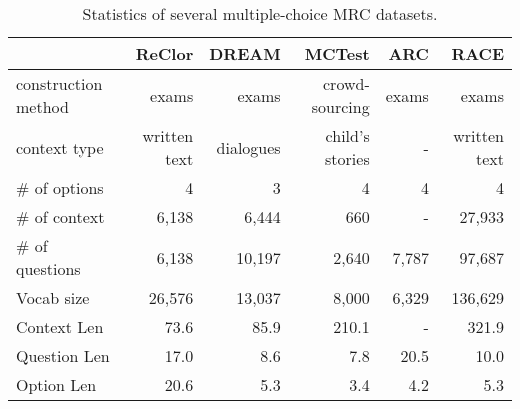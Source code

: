 \documentclass{article} \usepackage{iclr2020_conference,times}
\begin{document}
\begin{table}
\centering
\small
\begin{tabular}{lrrrrr}
& \textbf{ReClor}& \textbf{DREAM}& \textbf{MCTest}&\textbf{ARC} & \textbf{RACE}  \\ 
\hline
construction method         & exams    & exams     & crowd-sourcing &exams     & exams        \\
context type                & written text & dialogues & child's stories &-& written text \\ 
\# of options               & 4         & 3         & 4        &4        & 4            \\ 
\# of context               & 6,138     & 6,444     & 660      &-        & 27,933       \\ 
\# of questions             & 6,138     & 10,197    & 2,640     &7,787   & 97,687       \\
Vocab size                  & 26,576    & 13,037    & 8,000     & 6,329  & 136,629\\
Context Len                 & 73.6      & 85.9      & 210.1     & -      & 321.9\\
Question Len                & 17.0      & 8.6       & 7.8       & 20.5   & 10.0\\
Option Len                  & 20.6     & 5.3       & 3.4       & 4.2    & 5.3\\
\end{tabular}
\caption{\small Statistics of several multiple-choice MRC datasets. }
\label{table:datasets}
\end{table}
\end{document}
